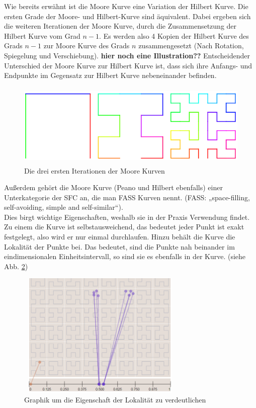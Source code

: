 \documentclass[course=erap]{aspdoc}
\begin{document}
\newpage %
Wie bereits erwähnt ist die Moore Kurve eine Variation der Hilbert Kurve. Die ersten Grade der Moore- und Hilbert-Kurve sind äquivalent. Dabei ergeben sich die weiteren Iterationen der Moore Kurve, durch die Zusammensetzung der Hilbert Kurve vom Grad $n - 1$.  Es werden also 4 Kopien der Hilbert Kurve des Grads $n-1$ zur Moore Kurve des Grads $n$ zusammengesetzt (Nach Rotation, Spiegelung und Verschiebung). \textbf{hier noch eine Illustration??}
Entscheidender Unterschied der Moore Kurve zur Hilbert Kurve ist, dass sich ihre Anfangs- und Endpunkte im Gegensatz zur Hilbert Kurve nebeneinander befinden.
\begin{figure}[h]
\centering
      \includegraphics[width=12cm, height=4cm]{Moore}
    \caption{Die drei ersten Iterationen der Moore Kurven}
    \label{fig:mooreCurve}
\end{figure}
Außerdem gehört die Moore Kurve (Peano und Hilbert ebenfalls) einer Unterkategorie der SFC an, die man FASS Kurven nennt. (FASS: „space-filling, self-avoiding, simple and self-similar“).\\
Dies birgt wichtige Eigenschaften, weshalb sie in der Praxis Verwendung findet. Zu einem die Kurve ist selbstausweichend, das bedeutet jeder Punkt ist exakt festgelegt, also wird er nur einmal durchlaufen. Hinzu behält die Kurve die Lokalität der Punkte bei. Das bedeutet, sind die Punkte nah beinander im eindimensionalen Einheitsintervall, so sind sie es ebenfalls in der Kurve. (siehe Abb. \ref{fig:locality}) %
\begin{figure}[h]
\centering
      \includegraphics[width=8cm, height=6cm]{Locality}
    \caption{Graphik um die Eigenschaft der Lokalität zu verdeutlichen} %
    \label{fig:locality}
\end{figure}
\end{document}
